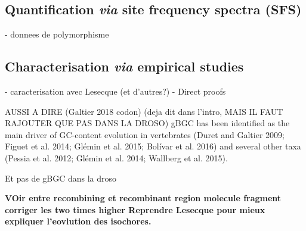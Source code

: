 \subsection{Quantification \textit{via} site frequency spectra (SFS)}
- donnees de polymorphisme
\subsection{Characterisation \textit{via} empirical studies}
- caracterisation avec Lesecque (et d'autres?)
- Direct proofs


AUSSI A DIRE (Galtier 2018 codon) (deja dit dans l'intro, MAIS IL FAUT RAJOUTER QUE PAS DANS LA DROSO)
gBGC has been identified as the main driver of GC-content evolution in vertebrates (Duret and Galtier 2009; Figuet et al. 2014; Glémin et al. 2015; Bolívar et al. 2016) and several other taxa (Pessia et al. 2012; Glémin et al. 2014; Wallberg et al. 2015).

Et pas de gBGC dans la droso



\textbf{VOir entre recombining et recombinant region molecule fragment
corriger les two times higher
Reprendre Lesecque pour mieux expliquer l'eovlution des isochores.}


%





